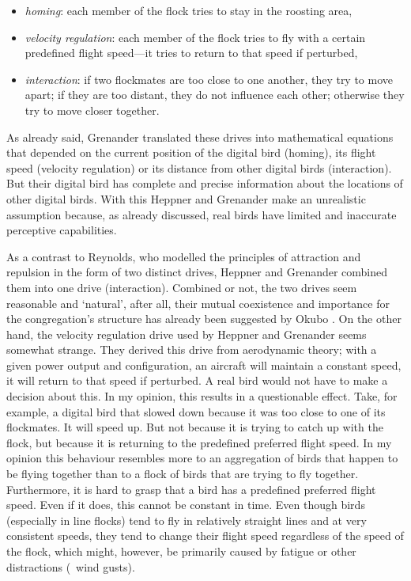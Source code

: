 \begin{itemize}
	\item \emph{homing}: each member of the flock tries to stay in the roosting area,

	\item \emph{velocity regulation}: each member of the flock tries to fly with a certain predefined flight speed---it tries to return to that speed if perturbed,
	
	\item \emph{interaction}: if two flockmates are too close to one another, they try to move apart; if they are too distant, they do not influence each other; otherwise they try to move closer together. 
\end{itemize}

As already said, Grenander translated these drives into mathematical equations that depended on the current position of the digital bird (homing), its flight speed (velocity regulation) or its distance from other digital birds (interaction). But their digital bird has complete and precise information about the locations of other digital birds. With this Heppner and Grenander make an unrealistic assumption because, as already discussed, real birds have limited and inaccurate perceptive capabilities.

As a contrast to Reynolds, who modelled the principles of attraction and repulsion in the form of two distinct drives, Heppner and Grenander combined them into one drive (interaction). Combined or not, the two drives seem reasonable and `natural', after all, their mutual coexistence and importance for the congregation's structure has already been suggested by Okubo \cite{okubo:1980}. On the other hand, the velocity regulation drive used by Heppner and Grenander seems somewhat strange. They derived this drive from aerodynamic theory; with a given power output and configuration, an aircraft will maintain a constant speed, it will return to that speed if perturbed. A real bird would not have to make a decision about this. In my opinion, this results in a questionable effect. Take, for example, a digital bird that slowed down because it was too close to one of its flockmates. It will speed up. But not because it is trying to catch up with the flock, but because it is returning to the predefined preferred flight speed. In my opinion this behaviour resembles more to an aggregation of birds that happen to be flying together than to a flock of birds that are trying to fly together. Furthermore, it is hard to grasp that a bird has a predefined preferred flight speed. Even if it does, this cannot be constant in time. Even though birds (especially in line flocks) tend to fly in relatively straight lines and at very consistent speeds, they tend to change their flight speed regardless of the speed of the flock, which might, however, be primarily caused by fatigue or other distractions (\eg\ wind gusts). 

